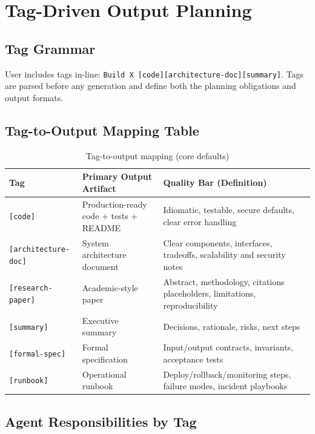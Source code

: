 \documentclass[11pt]{article}
\begin{document}
\section{Tag-Driven Output Planning}

\subsection{Tag Grammar}

User includes tags in-line: \texttt{Build X [code][architecture-doc][summary]}.
Tags are parsed before any generation and define both the planning obligations and output formats.

\subsection{Tag-to-Output Mapping Table}

\begin{table}[H]
\centering
\caption{Tag-to-output mapping (core defaults)}
\label{tab:tag_mapping}
\begin{tabularx}{\textwidth}{@{}l X X@{}}
\toprule
\textbf{Tag} & \textbf{Primary Output Artifact} & \textbf{Quality Bar (Definition)} \\
\midrule
\texttt{[code]} & Production-ready code + tests + README & Idiomatic, testable, secure defaults, clear error handling \\
\texttt{[architecture-doc]} & System architecture document & Clear components, interfaces, tradeoffs, scalability and security notes \\
\texttt{[research-paper]} & Academic-style paper & Abstract, methodology, citations placeholders, limitations, reproducibility \\
\texttt{[summary]} & Executive summary & Decisions, rationale, risks, next steps \\
\texttt{[formal-spec]} & Formal specification & Input/output contracts, invariants, acceptance tests \\
\texttt{[runbook]} & Operational runbook & Deploy/rollback/monitoring steps, failure modes, incident playbooks \\
\bottomrule
\end{tabularx}
\end{table}

\subsection{Agent Responsibilities by Tag}
\end{document}
